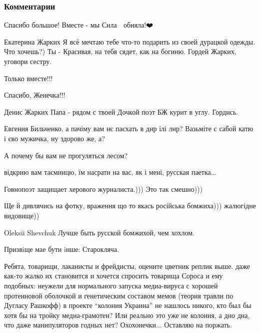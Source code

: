  
 
 
 
 
\subsubsection{Комментарии}
\begin{itemize}


Спасибо большое! Вместе - мы Сила 💪 обняла!❤️


Екатерина Жарких Я всё мечтаю тебе что-то подарить из своей дурацкой одежды.
Что хочешь?) Ты - Красивая, на тебя сядет, как на богиню. Гордей Жарких,
уговори сестру.


Только вместе!!!

Спасибо, Женечка!!!

Денис Жарких Папа - рядом с твоей Дочкой поэт БЖ курит в углу. Гордись.

Евгения Бильченко, а пачіму вам нє паєхать в днр ілі лнр? Вазьміте с сабой катю і єво мужичка, ну здорово же, а?

А почему бы вам не прогуляться лесом?

відкрию вам таємницю, їм насрати на вас, як і мені, русская паетка...

Говнопоэт защищает херового журналиста.))) Это так смешно)))

Ще й дивлячись на фотку, враження що то якась російська бомжиха))) жалюгідне видовище))

Oleksii Shevchuk Лучше быть русской бомжихой, чем хохлом.

Призвiще мае бути iнше: Старокляча.


Ребята, товарищи, лаканисты и фрейдисты, оцените цветник реплик выше. даже
как-то жалко их становится и хочется спросить товарища Сороса и ему подобных:
неужели для нормального запуска медиа-вируса с хорошей протеиновой оболочкой и
генетическим составом мемов (теория травли по Дугласу Рашкофф) в проекте
\enquote{колония Украина} не нашлось никого, кто был бы хотя бы на тройку
медиа-грамотен? Или реально это уже не колония, а дно дна, что даже
манипуляторов годных нет? Охохонечки... Оставляю на поржать.


\end{itemize}
